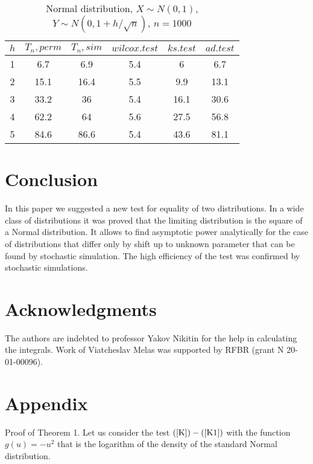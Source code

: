 \documentclass{svproc}
\begin{document}
\begin{table}
  \caption{Normal distribution, $X\sim N(0,1)$, $Y\sim N(0, 1 + h/\sqrt{n})$, $n=1000$}
  \begin{center}
  \begin{tabular}{c@{\quad}c@{\quad}c@{\quad}c@{\quad}c@{\quad}c}
  \hline
  $h$ & $T_n, perm$ & $T_n, sim$ & $wilcox.test$ & $ks.test$ & $ad.test$ \\
  \hline
  1 & 6.7 & 6.9 & 5.4 & 6 & 6.7 \\
  2 & 15.1 & 16.4 & 5.5 & 9.9 & 13.1 \\
  3 & 33.2 & 36 & 5.4 & 16.1 & 30.6 \\
  4 & 62.2 & 64 & 5.6 & 27.5 & 56.8 \\
  5 & 84.6 & 86.6 & 5.4 & 43.6 & 81.1 \\
  \hline
  \end{tabular}
  \end{center}
\end{table}





\section{Conclusion}
In this paper we suggested a new test for equality of two distributions. In a wide class of distributions it was proved that the limiting distribution is the square of a Normal distribution. It allows to find asymptotic power  analytically  for the case of distributions that differ only by shift up to unknown parameter that can be found by stochastic simulation. The high efficiency of the test was confirmed by stochastic simulations. 



\section*{Acknowledgments}
The authors are indebted to professor Yakov Nikitin for the help in calculating the  integrals. Work of Viatcheslav Melas was supported by RFBR (grant N 20-01-00096).

\section{Appendix}
Proof of Theorem 1.
Let us consider the test $(\ref{K})-(\ref{K1})$ with the function $g(u)=-u^2$ that is the logarithm of the density of the standard Normal distribution.
\end{document}
